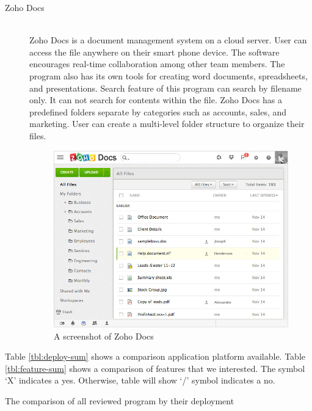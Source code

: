 \begin{description}
\item[Zoho Docs] \hfill \\
Zoho Docs is a document management system on a cloud server.
User can access the file anywhere on their smart phone device.
The software encourages real-time collaboration among other team members.
The program also has its own tools for creating word documents, spreadsheets, and presentations.
Search feature of this program can search by filename only.
It can not search for contents within the file.
Zoho Docs has a predefined folders separate by categories such as accounts, sales, and marketing.
User can create a multi-level folder structure to organize their files.
\begin{figure}[h]
	\centering
	\includegraphics[scale=0.55]{res/literature/screenshot_zoho}
	\caption{A screenshot of Zoho Docs }
\end{figure}
\end{description}

Table \ref{tbl:deploy-sum} shows a comparison application platform available.
Table \ref{tbl:feature-sum} shows a comparison of features that we interested.
The symbol \enquote*{X} indicates a yes.
Otherwise, table will show \enquote*{/} symbol indicates a no.

\clearpage

\begin{table}
	\centering
    
    \caption{The comparison of all reviewed program by their deployment}
    \label{tbl:deploy-sum}
\end{table}

